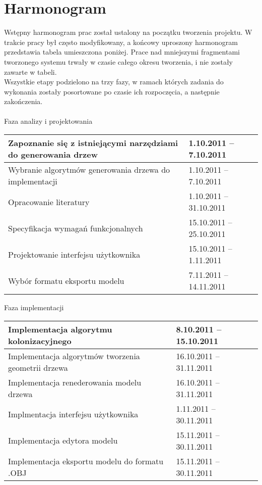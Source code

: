 \section{Harmonogram}
Wstępny harmonogram prac został ustalony na początku tworzenia projektu. W trakcie pracy był często
modyfikowany, a końcowy uproszony harmonogram przedstawia tabela umieszczona poniżej. Prace nad mniejszymi fragmentami
tworzonego systemu trwały w czasie całego okresu tworzenia, i nie zostały zawarte w tabeli. 
\\\indent Wszystkie etapy podzielono na trzy fazy, w ramach których zadania do wykonania zostały posortowane
po czasie ich rozpoczęcia, a następnie zakończenia.\\ \\
    \indent Faza analizy i projektowania
	\begin{longtable}{|p{85mm}|p{42mm}|} \hline
	

    Zapoznanie się z istniejącymi narzędziami do generowania drzew &
    1.10.2011 -- 7.10.2011
    
    \\ \hline
    Wybranie algorytmów generowania drzewa do implementacji&
    1.10.2011 -- 7.10.2011
    \\ \hline

    Opracowanie literatury&
    1.10.2011 -- 31.10.2011
    \\ \hline

    Specyfikacja wymagań funkcjonalnych&
    15.10.2011 -- 25.10.2011
    \\ \hline
    
    Projektowanie interfejsu użytkownika &
    15.10.2011 -- 1.11.2011
    \\ \hline

    Wybór formatu eksportu modelu &
    7.11.2011 -- 14.11.2011
        \\ \hline

    
    \end{longtable}
	
     Faza implementacji
    \begin{longtable}{|p{85mm}|p{42mm}|} \hline
    Implementacja algorytmu kolonizacyjnego &
    8.10.2011 -- 15.10.2011
    \\ \hline

    Implementacja algorytmów tworzenia geometrii drzewa &
    16.10.2011 -- 31.11.2011 
    \\ \hline

    Implementacja renederowania modelu drzewa &
    16.10.2011 -- 31.11.2011
    \\ \hline

    Implmentacja interfejsu użytkownika &
    1.11.2011 -- 30.11.2011
    \\ \hline

    Implementacja edytora modelu &
    15.11.2011 -- 30.11.2011
    \\ \hline

    Implementacja eksportu modelu do formatu .OBJ&
    15.11.2011 -- 30.11.2011
    \\ \hline
	
   
    
    \end{longtable}
	
